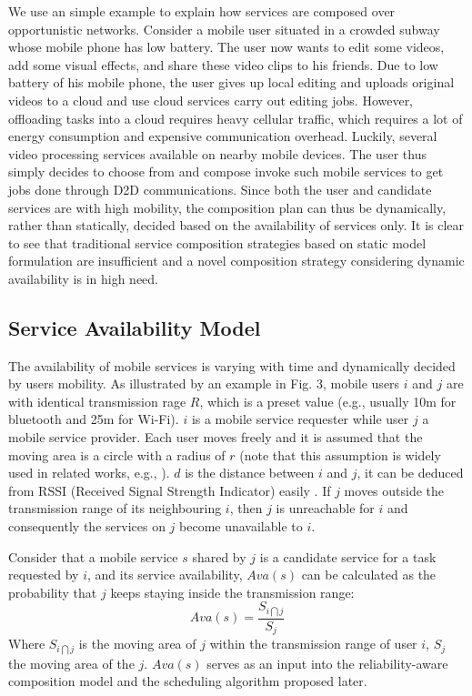 \documentclass[journal]{IEEEtran}
\begin{document}
We use an simple example to explain how services are composed over opportunistic networks.
Consider a mobile user situated in a crowded subway whose mobile phone has low battery. 
The user now wants to edit some videos, add some visual effects, and share these video clips to his friends.
Due to low battery of his mobile phone, the user gives up local editing and uploads original videos to a cloud and use cloud services carry out editing jobs. However, offloading tasks into a cloud requires heavy cellular traffic, which requires a lot of energy consumption and expensive communication overhead.
Luckily, several video processing services available on nearby mobile devices. The user thus simply decides to choose from and compose invoke such mobile services to get jobs done through D2D communications. 
Since both the user and candidate services are with high mobility, the composition plan can thus be dynamically, rather than statically, decided based on the availability of services only.  It is clear to see that traditional service composition strategies based on static model formulation are insufficient and a novel composition strategy considering dynamic availability is in high need.

\subsection{Service Availability Model}

The availability of mobile services is varying with time and dynamically decided by users mobility. 
As illustrated by an example in Fig. 3, mobile users $i$ and $j$ are with identical transmission rage $R$, which is a preset value (e.g., usually 10m for bluetooth and 25m for Wi-Fi). $i$ is a mobile service requester while user $j$ a mobile service provider. Each user moves freely and it is assumed that the moving area is a circle with a radius of $r$ (note that this assumption is widely used in related works, e.g., \cite{Yang2010, Deng2017, wu2001personal}). $d$ is the distance between $i$ and $j$, it can be deduced from RSSI (Received Signal Strength Indicator) easily \cite{benkic2008using}. If $j$ moves outside the transmission range of its neighbouring $i$, then $j$ is unreachable for $i$ and consequently the services on $j$ become unavailable to $i$.

Consider that a mobile service $s$ shared by $j$ is a candidate service for a task requested by $i$, and its service availability, $Ava(s)$ can be calculated as the probability that $j$ keeps staying inside the transmission range:
\begin{equation}
Ava(s) = \frac{S_{i \bigcap j}}{S_j}
\end{equation}
Where $S_{i \bigcap j}$ is the moving area of $j$ within the transmission range of user $i$, $S_j$ the moving area of the $j$. $Ava(s)$ serves as an input into the reliability-aware composition model and the scheduling algorithm proposed later.
\end{document}
